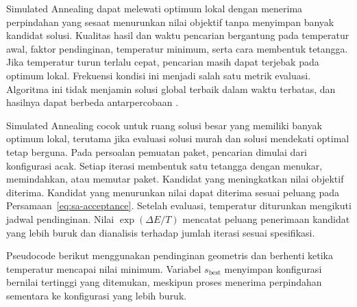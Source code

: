Simulated Annealing dapat melewati optimum lokal dengan menerima perpindahan yang sesaat menurunkan nilai objektif tanpa menyimpan banyak kandidat solusi. Kualitas hasil dan waktu pencarian bergantung pada temperatur awal, faktor pendinginan, temperatur minimum, serta cara membentuk tetangga. Jika temperatur turun terlalu cepat, pencarian masih dapat terjebak pada optimum lokal. Frekuensi kondisi ini menjadi salah satu metrik evaluasi. Algoritma ini tidak menjamin solusi global terbaik dalam waktu terbatas, dan hasilnya dapat berbeda antarpercobaan \cite{russell2021artificial,kirkpatrick1983optimization}.

Simulated Annealing cocok untuk ruang solusi besar yang memiliki banyak optimum lokal, terutama jika evaluasi solusi murah dan solusi mendekati optimal tetap berguna. Pada persoalan pemuatan paket, pencarian dimulai dari konfigurasi acak. Setiap iterasi membentuk satu tetangga dengan menukar, memindahkan, atau memutar paket. Kandidat yang meningkatkan nilai objektif diterima. Kandidat yang menurunkan nilai dapat diterima sesuai peluang pada Persamaan~\ref{eq:sa-acceptance}. Setelah evaluasi, temperatur diturunkan mengikuti jadwal pendinginan. Nilai $\exp(\Delta E/T)$ mencatat peluang penerimaan kandidat yang lebih buruk dan dianalisis terhadap jumlah iterasi sesuai spesifikasi.

Pseudocode berikut menggunakan pendinginan geometris dan berhenti ketika temperatur mencapai nilai minimum. Variabel $s_{\text{best}}$ menyimpan konfigurasi bernilai tertinggi yang ditemukan, meskipun proses menerima perpindahan sementara ke konfigurasi yang lebih buruk.

